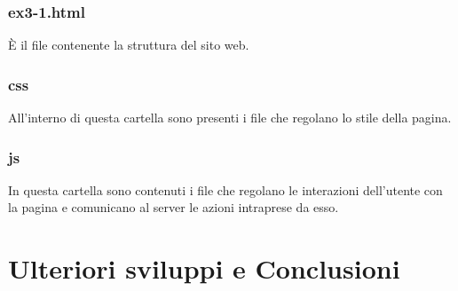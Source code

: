 \documentclass[11pt]{article}
\begin{document}
\subsubsection{ex3-1.html} 
È il file contenente la struttura del sito web.
\subsubsection{css}
All'interno di questa cartella sono presenti i file che regolano lo stile della pagina.
\subsubsection{js}
In questa cartella sono contenuti i file che regolano le interazioni dell'utente con la pagina e comunicano al server le azioni intraprese da esso.

\section{Ulteriori sviluppi e Conclusioni}	
%
%
\end{document}
